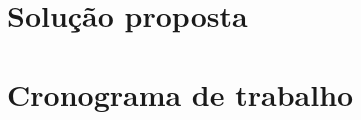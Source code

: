 \documentclass[
    12pt,                %
    openright,           %
    oneside,             %
    a4paper,             %
    english,             %
    brazil               %
]{abntex2}
\begin{document}
\section{Solução proposta}
\label{sec:solucao}


\section{Cronograma de trabalho}
\label{sec:cronograma}


\postextual

%
%
%


%
%
%

%
%
%
\end{document}
